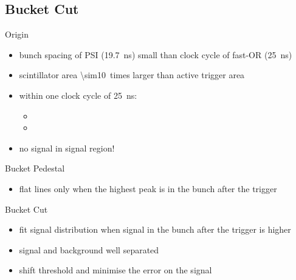\subsection{Bucket Cut}
\begin{frame}[noframenumbering]{Origin}

	
	\begin{itemize}\itemfill
		\item bunch spacing of PSI (\SI{19.7}{\nano\second}) small than clock cycle of fast-OR (\SI{25}{\nano\second})
		\item scintillator area \SI{\sim10}{times} larger than active trigger area
		\item within one clock cycle of \SI{25}{\nano\second}:
		\begin{itemize}
			\item {}
			\item {}
		\end{itemize}
		\item \ra no signal in signal region!
	\end{itemize}
	
\end{frame}
\begin{frame}[noframenumbering]{Bucket Pedestal}

	
	\begin{itemize}\itemfill
		\item flat lines only when the highest peak is in the bunch after the trigger
	\end{itemize}
		
\end{frame}
\begin{frame}[noframenumbering]{Bucket Cut}

	\vspace*{-15pt}
	
	\begin{itemize}\itemfill
		\item fit signal distribution when signal in the bunch after the trigger is higher
		\item signal and background well separated
		\item shift threshold and minimise the error on the signal
	\end{itemize}
		
\end{frame}%
